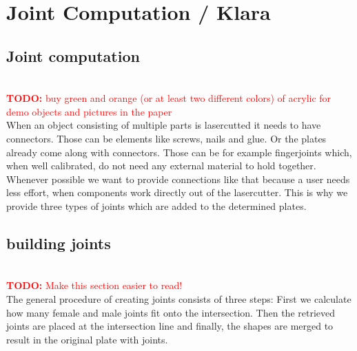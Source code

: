 \documentclass[../ClassicThesis.tex]{subfiles}
\begin{document}
\chapter{Joint Computation / Klara}\label{ch:joints}
\newcommand{\TODO}[1]{\textcolor{red}{\\ \textbf{TODO:} #1 \\}}


\section{Joint computation}
\TODO{buy green and orange (or at least two different colors) of acrylic for demo objects and pictures in the paper}
When an object consisting of multiple parts is lasercutted it needs to have connectors. Those can be elements like screws, nails and glue. Or the plates already come along with connectors. Those can be for example fingerjoints which, when well calibrated, do not need any external material to hold together. \\
Whenever possible we want to provide connections like that because a user needs less effort, when components work directly out of the lasercutter. This is why we provide three types of joints which are added to the determined plates.

\section{building joints}
\TODO{Make this section easier to read!}
The general procedure of creating joints consists of three steps: First we calculate how many female and male joints fit onto the intersection. Then the retrieved joints are placed at the intersection line and finally, the shapes are merged to result in the original plate with joints.
\end{document}
